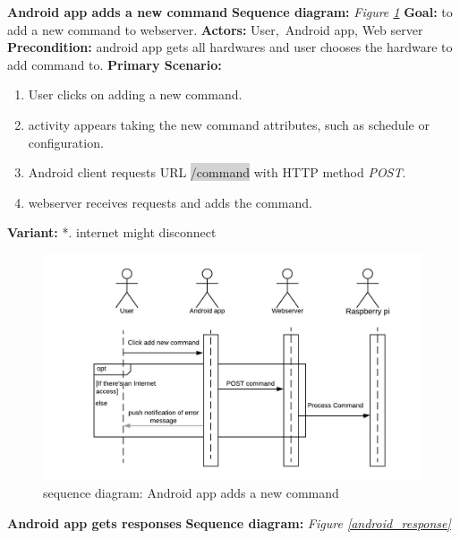 \documentclass[12pt, oneside, a4paper]{book}
\newcommand{\code}[1]{{\color{red}\colorbox{lightgray}{#1}}}
\newcommand\boldcolor[1]{\textcolor{bold}{\textbf{#1}}}
\begin{document}
				\newpage\hspace*{-6mm}\boldcolor{Android app adds a new command}
				\newline\textbf{Sequence diagram:} \textit{Figure \ref{android_add}}
				\newline\textbf{Goal:} to add a new command to webserver.
				\newline\textbf{Actors:} User, Android app, Web server
				\newline\textbf{Precondition:} android app gets all hardwares and user chooses the hardware to add command to.
				\newline\textbf{Primary Scenario:}	
				\begin{enumerate}[label*=\arabic*.]
					\item User clicks on adding  a new command.
					\item activity appears taking the new command attributes, such as schedule or configuration.
					\item Android client requests URL \code{/command} with HTTP method \textit{POST}.
					\item  webserver receives requests and adds the command.
				\end{enumerate}
				\textbf{Variant:}\newline
				\hspace*{5mm}*. internet might disconnect\\
				\begin{figure}[H]
					\includegraphics[width=\linewidth]{img/sequence_android_add.jpg}
					\caption{sequence diagram: Android app adds a new command}
					\label{android_add}
				\end{figure}
				\newpage\hspace*{-6mm}\boldcolor{Android app gets responses}
				\newline\textbf{Sequence diagram:} \textit{Figure \ref{android_response}}
\end{document}
